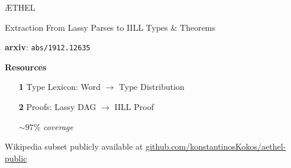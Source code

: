 \documentclass{beamer}
\begin{document}
\begin{frame}{\AE THEL}

	\begin{block}{Extraction}
	From Lassy Parses to IILL Types \& Theorems
	\begin{flushright}
	\textbf{arxiv}: \quad \texttt{abs/1912.12635}
	\end{flushright}
	\end{block}
	\vfill

	\textbf{Resources}	
	\begin{itemize}
	\item[\textbf{1}] Type Lexicon: Word $\to$ Type Distribution
	\item[\textbf{2}] Proofs: Lassy DAG $\to$ IILL Proof
	\begin{flushright}
		\footnotesize
			$\sim97\%$ \textit{coverage}
	\end{flushright}
	\end{itemize}
	
	\small{
	Wikipedia subset publicly available at
	\url{github.com/konstantinosKokos/aethel-public}}
		
\end{frame}
\end{document}
